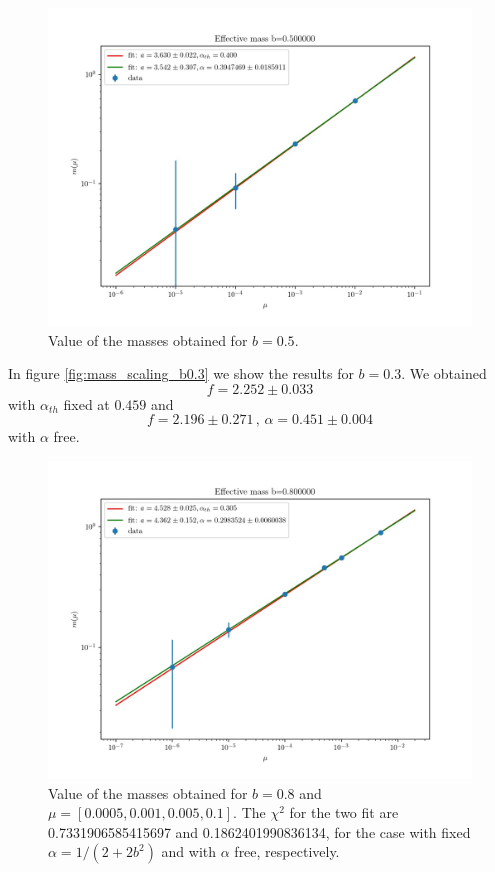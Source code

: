 \documentclass[12pt,a4paper]{report}
\begin{document}
\begin{figure}
\label{fig:mass_scaling_b0.5}
\centering
\includegraphics[width=1.0\textwidth]{b0_5}
\caption{Value of the masses obtained for $b=0.5$.}
\end{figure}

In figure \ref{fig:mass_scaling_b0.3} we show the results for $b=0.3$. We obtained \begin{equation}
f = 2.252 \pm 0.033
\end{equation} with $\alpha_{th}$ fixed at $0.459$ and \begin{equation}
f= 2.196 \pm 0.271 \,,\, \alpha = 0.451 \pm 0.004
\end{equation} with $\alpha$ free.


\begin{figure}
\label{fig:mass_scaling_b0.8}
\centering
\includegraphics[width=1.0\textwidth]{b0_8}
\caption{Value of the masses obtained for $b=0.8$ and 
$\mu = [0.0005,0.001,0.005,0.1]$. The $\chi^2$ for the two fit are 0.7331906585415697
 and 0.1862401990836134, for the case with fixed $\alpha = 1/(2+2b^2)$ and with $\alpha$ free, respectively.}
\end{figure}
\end{document}

